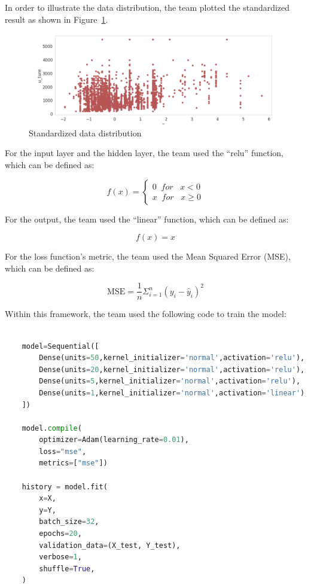 \documentclass{scrartcl}
\begin{document}
\newpage

\noindent In order to illustrate the data distribution, the team plotted the standardized result as shown in Figure~\ref{fig:NN4}. 

\begin{figure}[H]
	\begin{center}
		\includegraphics[scale=1.0]{Graphics/Neural Network Images/NN4.png}
	\end{center}
	\caption{Standardized data distribution}
	\label{fig:NN4}
\end{figure}


\noindent For the input layer and the hidden layer, the team used the “relu” function, which can be defined as:

\[f(x) = \left\{\begin{matrix}
0 \;\;for \;\;\;x<0\\ 
x \;\;for \;\;\;x\geqslant 0
\end{matrix}\right.\]

\noindent For the output, the team used the “linear” function, which can be defined as: 

\[f(x) = x\]

\noindent For the loss function’s metric, the team used the Mean Squared Error (MSE), which can be defined as:

\[\mathrm{MSE}=\frac{1}{n} \Sigma_{i=1}^n\left(y_i-\hat{y}_i\right)^2\]

\noindent Within this framework, the team used the following code to train the model:

\begin{lstlisting}[language=Python, caption= Code for training model for all features, basicstyle=\tiny,captionpos=b]

    model=Sequential([
        Dense(units=50,kernel_initializer='normal',activation='relu'),    
        Dense(units=20,kernel_initializer='normal',activation='relu'),
        Dense(units=5,kernel_initializer='normal',activation='relu'),
        Dense(units=1,kernel_initializer='normal',activation='linear'),
    ])

    model.compile(
        optimizer=Adam(learning_rate=0.01),
        loss="mse",
        metrics=["mse"])

    history = model.fit(
        x=X,
        y=Y,
        batch_size=32,
        epochs=20,
        validation_data=(X_test, Y_test),
        verbose=1,
        shuffle=True,
    )

\end{lstlisting}
\end{document}
